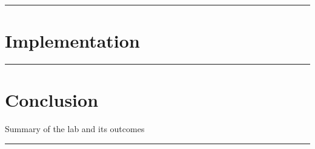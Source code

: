 \documentclass{article}
\begin{document}
\vspace{5mm}
\hrule

\section*{\textcolor{mycolor}{Implementation}}
\vspace{5mm}
\hrule

\section*{\textcolor{mycolor}{Conclusion}}
Summary of the lab and its outcomes
\vspace{5mm}
\hrule
\end{document}
